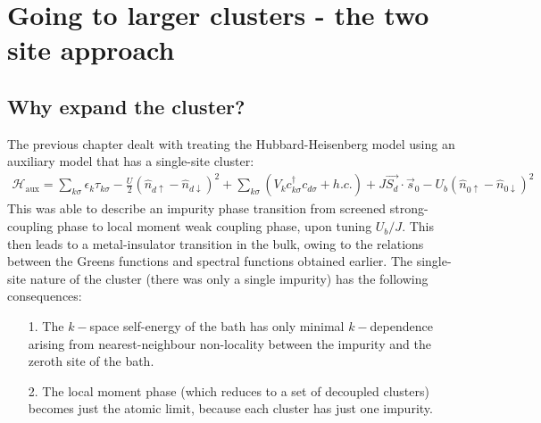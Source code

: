 \documentclass{report}
\numberwithin{equation}{section}
\begin{document}
\chapter{Going to larger clusters - the two site approach}

\section{Why expand the cluster?}
The previous chapter dealt with treating the Hubbard-Heisenberg model using an auxiliary model that has a single-site cluster:
\begin{equation}\begin{aligned}
	\mathcal{H}_\text{aux} =  \sum_{k\sigma}\epsilon_k \tau_{k\sigma} - \frac{U}{2}\left( \hat n_{d \uparrow} - \hat n_{d \downarrow} \right) ^2 + \sum_{k\sigma} \left(V_{k} c^\dagger_{k\sigma} c_{d\sigma} + h.c.\right) +J \vec{S_d}\cdot\vec{s}_0 - U_b\left(\hat n_{0 \uparrow} - \hat n_{0 \downarrow}\right)^2
\end{aligned}\end{equation}
This was able to describe an impurity phase transition from screened strong-coupling phase to local moment weak coupling phase, upon tuning \(U_b/J\). This then leads to a metal-insulator transition in the bulk, owing to the relations between the Greens functions and spectral functions obtained earlier. The single-site nature of the cluster (there was only a single impurity) has the following consequences:
\begin{itemize}
	\item [1.] The \(k-\)space self-energy of the bath has only minimal \(k-\)dependence arising from nearest-neighbour non-locality between the impurity and the zeroth site of the bath.
	\item [2.] The local moment phase (which reduces to a set of decoupled clusters) becomes just the atomic limit, because each cluster has just one impurity.
\end{itemize}
\end{document}
